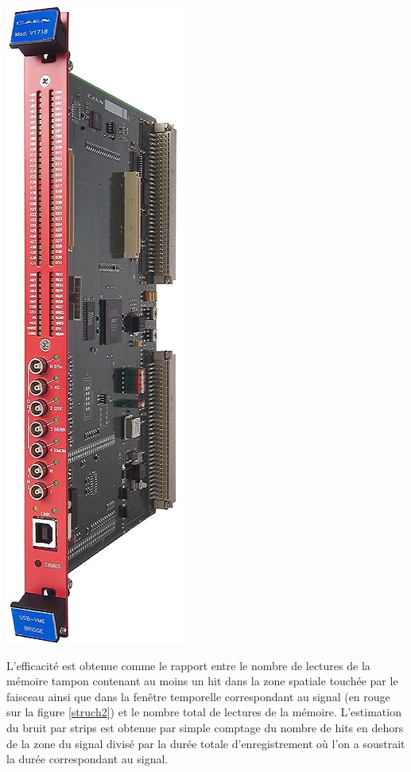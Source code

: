 \marginpar
{
	\centering
	\includegraphics[width=0.5\marginparwidth]{GLA/VMEUSB.png}
	\label{VME}
}

L'efficacité est obtenue comme le rapport entre le nombre de lectures de la mémoire tampon contenant au moins un hit dans la zone spatiale touchée par le faisceau ainsi que dans la fenêtre temporelle correspondant au signal (en rouge sur la figure \ref{struch2}) et le nombre total de lectures de la mémoire. L'estimation du bruit par strips est obtenue par simple comptage du nombre de hits en dehors de la zone du signal divisé par la durée totale d'enregistrement où l'on a soustrait la durée correspondant au signal.

